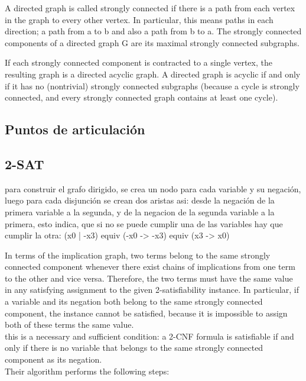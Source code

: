 \documentclass[10pt,letterpaper,twocolumn,twosided]{article}
\newcommand{\codigofuente}[1]{

\dotfill
}
\begin{document}
A directed graph is called strongly connected if there is a path from each vertex in the graph to every other vertex. In particular, this means paths in each direction; a path from a to b and also a path from b to a. The strongly connected components of a directed graph G are its maximal strongly connected subgraphs. 

If each strongly connected component is contracted to a single vertex, the resulting graph is a directed acyclic graph. A directed graph is acyclic if and only if it has no (nontrivial) strongly connected subgraphs (because a cycle is strongly connected, and every strongly connected graph contains at least one cycle).

\codigofuente{src/graphs/tarjanJava.cpp}

\subsection{Puntos de articulación}


\codigofuente{src/graphs/puntos_articulacion.cpp}

\subsection{2-SAT}
para construir el grafo dirigido, se crea un nodo para cada variable y su negación, luego para cada disjunción se crean dos aristas asi:  desde la negación de la primera variable a la segunda, y de la negacion de la segunda variable a la primera, esto indica, que si no se puede cumplir una de las variables hay que cumplir la otra:
    (x0 | -x3) equiv (-x0 -> -x3) equiv (x3 -> x0)


In terms of the implication graph, two terms belong to the same strongly connected component whenever there exist chains of implications from one term to the other and vice versa. Therefore, the two terms must have the same value in any satisfying assignment to the given 2-satisfiability instance. In particular, if a variable and its negation both belong to the same strongly connected component, the instance cannot be satisfied, because it is impossible to assign both of these terms the same value.
\\
this is a necessary and sufficient condition: a 2-CNF formula is satisfiable if and only if there is no variable that belongs to the same strongly connected component as its negation.
\\
Their algorithm performs the following steps:
\end{document}
